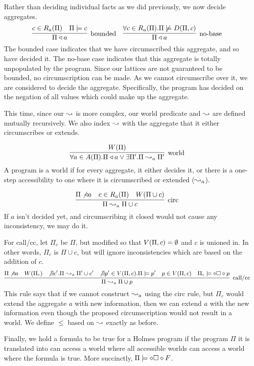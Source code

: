 Rather than deciding individual facts as we did previously, we now decide aggregates.
\[
	\infer[\textrm{bounded}]{\Pi \decides a}{c \in \circset_a(\Pi) & \Pi \models c}
	\quad
	\infer[\textrm{no-base}]{\Pi \decides a}{\forall c \in \circset_a(\Pi). \Pi \not \models \decirc{\Pi}{c}}
\]
The bounded case indicates that we have circumscribed this aggregate, and so have decided it.
The no-base case indicates that this aggregate is totally unpopulated by the program.
Since our lattices are not guaranteed to be bounded, no circumscription can be made.
As we cannot circumscribe over it, we are considered to decide the aggregate.
Specifically, the program has decided on the negation of all values which could make up the aggregate.

This time, since our $\leadsto$ is more complex, our world predicate and $\leadsto$ are defined mutually recursively.
We also index $\leadsto$ with the aggregate that it either circumscribes or extends.

\[
	\infer[\textrm{world}]{\forall a \in \aggset(\Pi). \Pi \decides a \vee \exists \Pi'. \Pi \stepass_a \Pi'}{\world{\Pi}}
\]
A program is a world if for every aggregate, it either decides it, or there is a one-step accessibility to one where it is circumscribed or extended ($\leadsto_a$).

\[
	\infer[\textrm{circ}]{\Pi \stepass_a \Pi \cup c}{\Pi \not \decides a & c \in \circset_a(\Pi) & W(\Pi \cup c)}
\]
If $a$ isn't decided yet, and circumscribing it closed would not cause any inconsistency, we may do it.

For call/cc, let $\Pi_c$ be $\Pi$, but modified so that $V(\Pi, c) = \emptyset$ and $c$ is unioned in.
In other words, $\Pi_c$ is $\Pi \cup c$, but will ignore inconsistencies which are based on the addition of $c$.
\[\small
	\infer[\textrm{call/cc}]{\Pi \stepass_a \Pi \cup p}{\Pi \not \decides a & \world{\Pi_c} & \not \exists c'. \Pi \stepass_a \Pi' \cup c' & \not \exists p' \in \viol{\Pi}{c}. \Pi \models p' & p \in \viol{\Pi}{c} & \Pi_c \models \dia \boks \dia p}
\]
This rule says that if we cannot construct $\leadsto_a$ using the circ rule, but $\Pi_c$ would extend the aggregate $a$ with new information, then we can extend $a$ with the new information even though the proposed circumscription would not result in a world.
We define $\leq$ based on $\leadsto$ exactly as before.

Finally, we hold a formula to be true for a Holmes program if the program $\Pi$ it is translated into can access a world where all accessible worlds can access a world where the formula is true. More succinctly, $\Pi \models \diamond \square \diamond F$.
